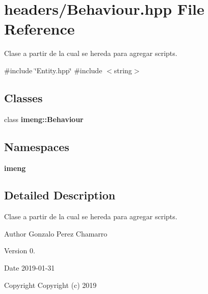 \section{headers/\+Behaviour.hpp File Reference}
\label{_behaviour_8hpp}


Clase a partir de la cual se hereda para agregar scripts.  


{\ttfamily \#include \char`\"{}Entity.\+hpp\char`\"{}}\newline
{\ttfamily \#include $<$string$>$}\newline
\subsection*{Classes}
\begin{DoxyCompactItemize}
\item 
class \textbf{ imeng\+::\+Behaviour}
\end{DoxyCompactItemize}
\subsection*{Namespaces}
\begin{DoxyCompactItemize}
\item 
 \textbf{ imeng}
\end{DoxyCompactItemize}


\subsection{Detailed Description}
Clase a partir de la cual se hereda para agregar scripts. 

\begin{DoxyAuthor}{Author}
Gonzalo Perez Chamarro 
\end{DoxyAuthor}
\begin{DoxyVersion}{Version}
0. 
\end{DoxyVersion}
\begin{DoxyDate}{Date}
2019-\/01-\/31
\end{DoxyDate}
\begin{DoxyCopyright}{Copyright}
Copyright (c) 2019 
\end{DoxyCopyright}

